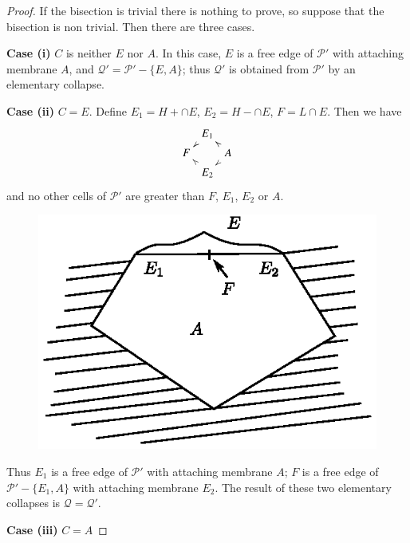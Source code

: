 \begin{proof}
If the bisection is trivial there is nothing to prove, so suppose that the bisection is non trivial. Then there are three cases.

\medskip
\noindent
{\bf Case (i)} $C$ is neither $E$ nor $A$. In this case, $E$ is a free edge of $\mathscr{P}'$ with attaching membrane $A$, and $\mathcal{Q}'=\mathscr{P}'-\{E,A\}$; thus $\mathcal{Q}'$ is obtained from $\mathscr{P}'$ by an elementary collapse. 

\medskip
\noindent
{\bf Case (ii)} $C=E$. Define $E_{1}=H+\cap E$, $E_{2}=H-\cap E$, $F=L\cap E$. Then we have
\[
\xymatrix@=.15cm{
 & E_{1}\ar@{{}>}[dl] &\\
F & & A\ar@{{}>}[ul]\ar@{{}>}[dl]\\
& E_{2}\ar@{{}>}[ul] & 
}
\]
and no other cells of $\mathscr{P}'$ are greater than $F$, $E_{1}$, $E_{2}$ or $A$.
\begin{figure}[H]
\centering
\includegraphics{figure/fig15.eps}
\end{figure}

Thus $E_{1}$ is a free edge of $\mathscr{P}'$ with attaching membrane $A$; $F$ is a free edge of $\mathscr{P}'-\{E_{1},A\}$ with attaching membrane $E_{2}$. The result of these two elementary collapses is $\mathcal{Q}=\mathcal{Q}'$.

\medskip
\noindent
{\bf Case (iii)} $C=A$\pageoriginale


\end{proof}
